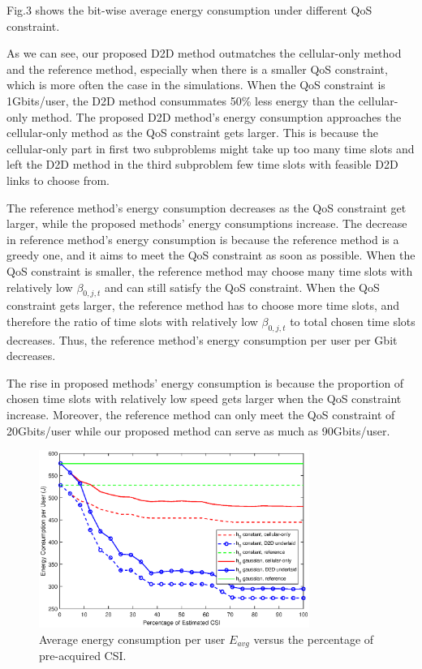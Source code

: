\documentclass{ieeeaccess}
\begin{document}


Fig.3 shows the bit-wise average energy consumption under different QoS constraint.

As we can see, our proposed D2D method outmatches the cellular-only method and the reference method, especially when there is a smaller QoS constraint, which is more often the case in the simulations. When the QoS constraint is 1Gbits/user, the D2D method consummates 50\% less energy than the cellular-only method. The proposed D2D method's energy consumption approaches the cellular-only method as the QoS constraint gets larger. This is because the cellular-only part in first two subproblems might take up too many time slots and left the D2D method in the third subproblem few time slots with feasible D2D links to choose from.

The reference method's energy consumption decreases as the QoS constraint get larger, while the proposed methods' energy consumptions increase. The decrease in reference method's energy consumption is because the reference method is a greedy one, and it aims to meet the QoS constraint as soon as possible. When the QoS constraint is smaller, the reference method may choose many time slots with relatively low ${\beta _{0,j,t}}$ and can still satisfy the QoS constraint. When the QoS constraint gets larger, the reference method has to choose more time slots, and therefore the ratio of time slots with relatively low ${\beta _{0,j,t}}$ to total chosen time slots decreases. Thus, the reference method's energy consumption per user per Gbit decreases.

The rise in proposed methods' energy consumption is because the proportion of chosen time slots with relatively low speed gets larger when the QoS constraint increase. Moreover, the reference method can only meet the QoS constraint of 20Gbits/user while our proposed method can serve as much as 90Gbits/user.

\begin{figure} [htb]
\includegraphics*[width=8.8cm]{Tranges.eps}
\caption{Average energy consumption per user $E_{avg}$ versus the percentage of pre-acquired CSI.} \label{fig:4}
\end{figure}
\end{document}
